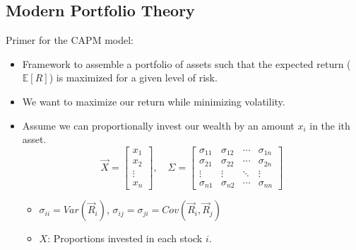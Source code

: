 \subsection{Modern Portfolio Theory}
Primer for the CAPM model:
\begin{intuition}
    \begin{itemize}
        \item Framework to assemble a portfolio of assets such that the expected return ($\mathbb{E}[R]$) is maximized for a given level of risk.
        \item We want to maximize our return while minimizing volatility.
        \item Assume we can proportionally invest our wealth by an amount $x_i$ in the ith asset. 
        \[
        \vec{X} = 
        \begin{bmatrix}
        x_1 \\
        x_2 \\
        \vdots \\
        x_n
        \end{bmatrix},
        \quad
        \Sigma = 
        \begin{bmatrix}
        \sigma_{11} & \sigma_{12} & \cdots & \sigma_{1n} \\
        \sigma_{21} & \sigma_{22} & \cdots & \sigma_{2n} \\
        \vdots & \vdots & \ddots & \vdots \\
        \sigma_{n1} & \sigma_{n2} & \cdots & \sigma_{nn}
        \end{bmatrix}
        \]

        \begin{itemize}
            \item \(\sigma_{ii} = Var(\vec{R}_i)\), \(\sigma_{ij} = \sigma_{ji} = Cov(\vec{R}_i, \vec{R}_j)\)
            \item $X$: Proportions invested in each stock $i$.
        \end{itemize}
    \end{itemize}
\end{intuition}

